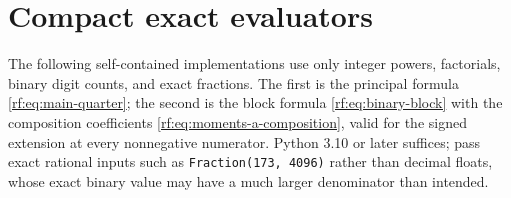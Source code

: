 \documentclass[11pt,oneside]{article}
\theoremstyle{plain}
\theoremstyle{definition}
\theoremstyle{remark}
\begin{document}
\clearpage
\appendix

\section{Compact exact evaluators}
\label{rf:app:code}

The following self-contained implementations use only integer powers,
factorials, binary digit counts, and exact fractions.  The first is the
principal formula \cref{rf:eq:main-quarter}; the second is the block formula
\cref{rf:eq:binary-block} with the composition coefficients
\cref{rf:eq:moments-a-composition}, valid for the signed extension at every
nonnegative numerator.  Python 3.10 or later suffices; pass exact rational
inputs such as \texttt{Fraction(173, 4096)} rather than decimal floats,
whose exact binary value may have a much larger denominator than intended.
\end{document}
